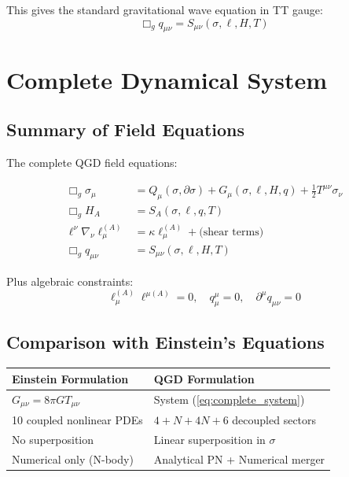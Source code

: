 \documentclass[11pt,a4paper]{article}
\theoremstyle{definition}
\theoremstyle{remark}
\begin{document}
		This gives the standard gravitational wave equation in TT gauge:
		\begin{equation}
			\Box_g q_{\mu\nu} = S_{\mu\nu}(\sigma, \ell, H, T)
		\end{equation}
		
		\section{Complete Dynamical System}
		
		\subsection{Summary of Field Equations}
		
		The complete QGD field equations:
		
		\begin{equation}\label{eq:complete_system}
			\boxed{\begin{aligned}
					\Box_g\sigma_\mu &= Q_\mu(\sigma, \partial\sigma) + G_\mu(\sigma, \ell, H, q) + \frac{1}{2}T^{\mu\nu}\sigma_\nu\\
					\Box_g H_A &= S_A(\sigma, \ell, q, T)\\
					\ell^\nu\nabla_\nu\ell_\mu^{(A)} &= \kappa\ell_\mu^{(A)} + \text{(shear terms)}\\
					\Box_g q_{\mu\nu} &= S_{\mu\nu}(\sigma, \ell, H, T)
			\end{aligned}}
		\end{equation}
		
		Plus algebraic constraints:
		\begin{equation}
			\ell_\mu^{(A)}\ell^{\mu(A)} = 0, \quad q^\mu_\mu = 0, \quad \partial^\mu q_{\mu\nu} = 0
		\end{equation}
		
		\subsection{Comparison with Einstein's Equations}
		
		\begin{center}
			\begin{tabular}{ll}
				\hline
				\textbf{Einstein Formulation} & \textbf{QGD Formulation}\\
				\hline
				$G_{\mu\nu} = 8\pi G T_{\mu\nu}$ & System (\ref{eq:complete_system})\\
				10 coupled nonlinear PDEs & $4 + N + 4N + 6$ decoupled sectors\\
				No superposition & Linear superposition in $\sigma$\\
				Numerical only (N-body) & Analytical PN + Numerical merger\\
				\hline
			\end{tabular}
		\end{center}
		
\end{document}
